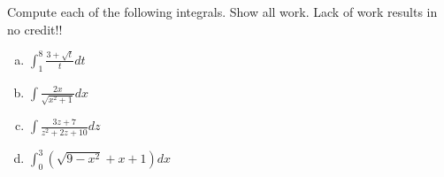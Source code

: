 \documentclass[11pt]{exam}
\theoremstyle{definition}
\begin{document}
\begin{questions}
\newpage
\question[10]
Compute each of the following integrals.  Show all work.
Lack of work results in no credit!!
\begin{enumerate}[(a)]
\item $\int_1^8 \frac{3 + \sqrt{t}}{t}dt$
\vspace{2in}
\item $\int\frac{2x}{\sqrt{x^2+1}}dx$
\vspace{2in}
\item $\int \frac{3z + 7}{z^2 + 2z + 10} dz$
\vspace{2in}
\item $\int_0^3 (\sqrt{9-x^2} + x + 1)dx$
\end{enumerate}




\end{questions}
\end{document}
